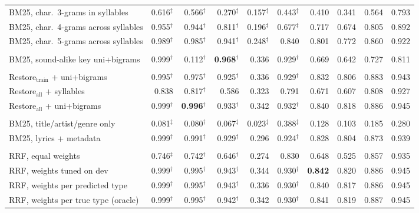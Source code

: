 \begin{table}[t]
\begin{tabular}{@{}l rrrrr r rrr@{}}
\quad BM25, char.\ 3-grams in syllables & 0.616$^{\ddagger}$ & 0.566$^{\dagger}$ & 0.270$^{\ddagger}$ & 0.157$^{\ddagger}$ & 0.443$^{\ddagger}$ & 0.410 & 0.341 & 0.564 & 0.793 \\
\quad BM25, char.\ 4-grams across syllables & 0.955$^{\dagger}$ & 0.944$^{\dagger}$ & 0.811$^{\dagger}$ & 0.196$^{\ddagger}$ & 0.677$^{\ddagger}$ & 0.717 & 0.674 & 0.805 & 0.892 \\
\quad BM25, char.\ 5-grams across syllables & 0.989$^{\dagger}$ & 0.985$^{\dagger}$ & 0.941$^{\dagger}$ & 0.248$^{\ddagger}$ & 0.840 & 0.801 & 0.772 & 0.860 & 0.922 \\
\addlinespace
\multicolumn{10}{l}{\textit{Sound-alike key}} \\
\quad BM25, sound-alike key uni+bigrams & 0.999$^{\dagger}$ & 0.112$^{\dagger}$ & \textbf{0.968}$^{\dagger}$ & 0.336 & 0.929$^{\dagger}$ & 0.669 & 0.642 & 0.727 & 0.811 \\
\addlinespace
\multicolumn{10}{l}{\textit{Diacritic restoration}} \\
\quad Restore$_{\mathrm{train}}$ + uni+bigrams & 0.995$^{\dagger}$ & 0.975$^{\dagger}$ & 0.925$^{\dagger}$ & 0.336 & 0.929$^{\dagger}$ & 0.832 & 0.806 & 0.883 & 0.943 \\
\quad Restore$_{\mathrm{all}}$ + syllables & 0.838 & 0.817$^{\dagger}$ & 0.586 & 0.323 & 0.791 & 0.671 & 0.607 & 0.808 & 0.927 \\
\quad Restore$_{\mathrm{all}}$ + uni+bigrams & 0.999$^{\dagger}$ & \textbf{0.996}$^{\dagger}$ & 0.933$^{\dagger}$ & 0.342 & 0.932$^{\dagger}$ & 0.840 & 0.818 & 0.886 & 0.945 \\
\addlinespace
\multicolumn{10}{l}{\textit{Metadata}} \\
\quad BM25, title/artist/genre only & 0.081$^{\ddagger}$ & 0.080$^{\dagger}$ & 0.067$^{\ddagger}$ & 0.023$^{\ddagger}$ & 0.388$^{\ddagger}$ & 0.128 & 0.103 & 0.185 & 0.280 \\
\quad BM25, lyrics + metadata & 0.999$^{\dagger}$ & 0.991$^{\dagger}$ & 0.929$^{\dagger}$ & 0.296 & 0.924$^{\dagger}$ & 0.828 & 0.804 & 0.873 & 0.939 \\
\addlinespace
\multicolumn{10}{l}{\textit{Lexical fusion (RRF)}} \\
\quad RRF, equal weights & 0.746$^{\ddagger}$ & 0.742$^{\dagger}$ & 0.646$^{\dagger}$ & 0.274 & 0.830 & 0.648 & 0.525 & 0.857 & 0.935 \\
\quad RRF, weights tuned on dev & 0.999$^{\dagger}$ & 0.995$^{\dagger}$ & 0.943$^{\dagger}$ & 0.344 & 0.930$^{\dagger}$ & \textbf{0.842} & 0.820 & 0.886 & 0.945 \\
\quad RRF, weights per predicted type & 0.999$^{\dagger}$ & 0.995$^{\dagger}$ & 0.943$^{\dagger}$ & 0.336 & 0.930$^{\dagger}$ & 0.840 & 0.817 & 0.886 & 0.945 \\
\quad RRF, weights per true type (oracle) & 0.999$^{\dagger}$ & 0.995$^{\dagger}$ & 0.942$^{\dagger}$ & 0.342 & 0.930$^{\dagger}$ & 0.841 & 0.819 & 0.887 & 0.945 \\
\bottomrule
\end{tabular}


\end{table}

